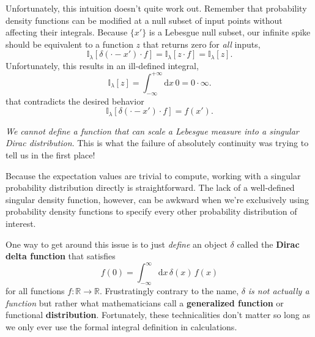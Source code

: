 \documentclass[
  letterpaper,
  DIV=11,
  numbers=noendperiod]{scrartcl}
\begin{document}
Unfortunately, this intuition doesn't quite work out. Remember that
probability density functions can be modified at a null subset of input
points without affecting their integrals. Because \(\{ x' \}\) is a
Lebesgue null subset, our infinite spike should be equivalent to a
function \(z\) that returns zero for \emph{all} inputs, \[
\mathbb{I}_{\lambda} [ \delta(\cdot - x') \cdot f]
=
\mathbb{I}_{\lambda} [ z \cdot f]
=
\mathbb{I}_{\lambda} [ z ].
\] Unfortunately, this results in an ill-defined integral, \[
\mathbb{I}_{\lambda} [ z ]
= \int_{-\infty}^{+\infty} \mathrm{d} x \, 0
= 0 \cdot \infty.
\] that contradicts the desired behavior \[
\mathbb{I}_{\lambda} [ \delta(\cdot - x') \cdot f] = f(x').
\]

\emph{We cannot define a function that can scale a Lebesgue measure into
a singular Dirac distribution}. This is what the failure of absolutely
continuity was trying to tell us in the first place!

Because the expectation values are trivial to compute, working with a
singular probability distribution directly is straightforward. The lack
of a well-defined singular density function, however, can be awkward
when we're exclusively using probability density functions to specify
every other probability distribution of interest.

One way to get around this issue is to just \emph{define} an object
\(\delta\) called the \textbf{Dirac delta function} that satisfies \[
f(0)
= \int_{-\infty}^{\infty} \mathrm{d} x \, \delta(x) \, f(x)
\] for all functions \(f : \mathbb{R} \rightarrow \mathbb{R}\).
Frustratingly contrary to the name, \(\delta\) \emph{is not actually a
function} but rather what mathematicians call a \textbf{generalized
function} or functional \textbf{distribution}. Fortunately, these
technicalities don't matter so long as we only ever use the formal
integral definition in calculations.
\end{document}
